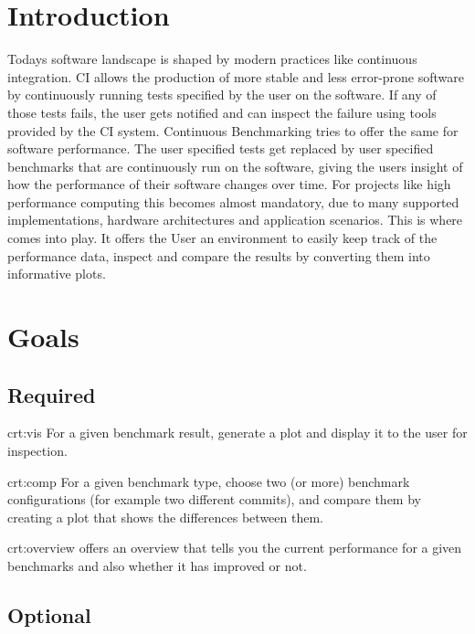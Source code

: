 \section{Introduction}

Todays software landscape is shaped by modern practices like continuous integration. CI allows the production of more stable and less error-prone software by continuously running tests specified by the user on the software. If any of those tests fails, the user gets notified and can inspect the failure using tools provided by the CI system. Continuous Benchmarking tries to offer the same for software performance. The user specified tests get replaced by user specified benchmarks that are continuously run on the software, giving the users insight of how the performance of their software changes over time. For projects like high performance computing this becomes almost mandatory, due to many supported implementations, hardware architectures and application scenarios. This is where \parkview{} comes into play. It offers the User an environment to easily keep track of the performance data, inspect and compare the results by converting them into informative plots.

\section{Goals}

\subsection{Required}

{crt:vis}
{For a given \gls{benchmark result}, generate a \gls{plot} and display it to the user for inspection.}

{crt:comp}
{For a given benchmark type, choose two (or more) \glspl{benchmark configuration} (for example two different commits), and compare them by creating a plot that shows the differences between them.}

{crt:overview}
{\parkview offers an overview that tells you the current performance for a given benchmarks and also whether it has improved or not.}

\subsection{Optional}

